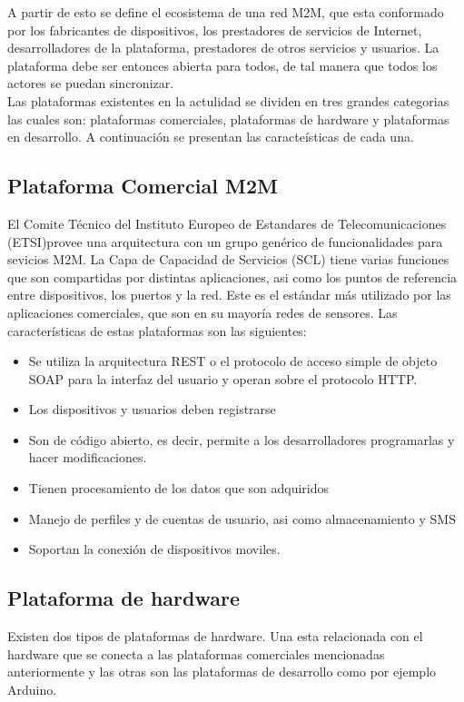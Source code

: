 \documentclass[journal]{IEEEtran}
\begin{document}
A partir de esto se define el ecosistema de una red M2M, que esta conformado por los fabricantes de dispositivos, los prestadores de servicios de Internet, desarrolladores de la plataforma, prestadores de otros servicios y usuarios. La plataforma debe ser entonces abierta para todos, de tal manera que todos los actores se puedan sincronizar.\\

Las plataformas existentes en la actulidad se dividen en tres grandes categorias las cuales son: plataformas comerciales, plataformas de hardware y plataformas en desarrollo. A continuaci\'on se presentan las caracte\'isticas de cada una.

\subsection{Plataforma Comercial M2M}
El Comite T\'ecnico del Instituto Europeo de Estandares de Telecomunicaciones (ETSI)provee una arquitectura con un grupo gen\'erico de funcionalidades para sevicios M2M. La Capa de Capacidad de Servicios (SCL) tiene varias funciones que son compartidas por distintas aplicaciones, asi como los puntos de referencia entre dispositivos, los puertos y la red. Este es el est\'andar m\'as utilizado por las aplicaciones comerciales, que son en su mayor\'ia redes de sensores. Las caracter\'isticas de estas plataformas son las siguientes:
\begin{itemize}
\item Se utiliza la arquitectura REST o el protocolo de acceso simple de objeto SOAP para la interfaz del usuario y operan sobre el protocolo HTTP.
\item Los dispositivos y usuarios deben registrarse
\item Son de c\'odigo abierto, es decir, permite a los desarrolladores programarlas y hacer modificaciones.
\item Tienen procesamiento de los datos que son adquiridos
\item Manejo de perfiles y de cuentas de usuario, asi como almacenamiento y SMS
\item Soportan la conexi\'on de dispositivos moviles.

\end{itemize}

\subsection{Plataforma de hardware}
Existen dos tipos de plataformas de hardware. Una esta relacionada con el hardware que se conecta a las plataformas comerciales mencionadas anteriormente y las otras son las plataformas de desarrollo como por ejemplo Arduino.
\end{document}
